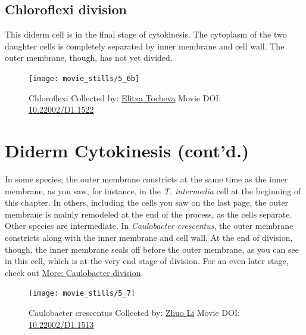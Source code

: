 \documentclass[]{tufte-book}
\begin{document}
\hypertarget{Chloroflexi_division}{\subsection{Chloroflexi
division}\label{Chloroflexi_division}}

This diderm cell is in the final stage of cytokinesis. The cytoplasm of
the two daughter cells is completely separated by inner membrane and
cell wall. The outer membrane, though, has not yet divided.





\begin{figure}
\texttt{[image: movie\_stills/5\_6b]} \caption[Chloroflexi Collected by:
\protect\hyperlink{elitza_tocheva}{Elitza Tocheva} Movie DOI:
\href{https://doi.org/10.22002/D1.1522}{10.22002/D1.1522}]{Chloroflexi Collected by:
\protect\hyperlink{elitza_tocheva}{Elitza Tocheva} Movie DOI:
\href{https://doi.org/10.22002/D1.1522}{10.22002/D1.1522}}\label{fig:5-6b}
\end{figure}

\section{Diderm Cytokinesis (cont'd.)}\label{diderm-cytokinesis-contd.}

In some species, the outer membrane constricts at the same time as the
inner membrane, as you saw, for instance, in the \emph{T. intermedia}
cell at the beginning of this chapter. In others, including the cells
you saw on the last page, the outer membrane is mainly remodeled at the
end of the process, as the cells separate. Other species are
intermediate. In \emph{Caulobacter crescentus}, the outer membrane
constricts along with the inner membrane and cell wall. At the end of
division, though, the inner membrane seals off before the outer
membrane, as you can see in this cell, which is at the very end stage of
division. For an even later stage, check out
\protect\hyperlink{Caulobacter_division}{More: Caulobacter division}.





\begin{figure}
\texttt{[image: movie\_stills/5\_7]} \caption[Caulobacter crescentus Collected by:
\protect\hyperlink{zhuo_li}{Zhuo Li} Movie DOI:
\href{https://doi.org/10.22002/D1.1513}{10.22002/D1.1513}]{Caulobacter crescentus Collected by:
\protect\hyperlink{zhuo_li}{Zhuo Li} Movie DOI:
\href{https://doi.org/10.22002/D1.1513}{10.22002/D1.1513}}\label{fig:5-7}
\end{figure}
\end{document}
